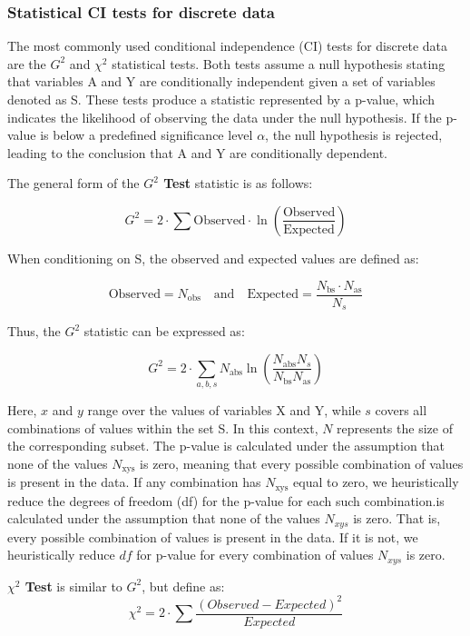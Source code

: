 \documentclass[main.tex]{subfiles}
\begin{document}
\subsubsection*{Statistical CI tests for discrete data}
The most commonly used conditional independence (CI) tests for discrete data are the $ G^2 $ and $ \chi^2 $ statistical tests. Both tests assume a null hypothesis stating that variables A and Y are conditionally independent given a set of variables denoted as S. These tests produce a statistic represented by a p-value, which indicates the likelihood of observing the data under the null hypothesis. If the p-value is below a predefined significance level $ \alpha $, the null hypothesis is rejected, leading to the conclusion that A and Y are conditionally dependent.

The general form of the \textbf{$ G^2 $ Test} statistic is as follows:

\[
G^2 = 2 \cdot \sum \text{Observed} \cdot \ln \left( \frac{\text{Observed}}{\text{Expected}} \right)
\]

When conditioning on S, the observed and expected values are defined as:

\[
\text{Observed} = N_{\text{obs}} \quad \text{and} \quad \text{Expected} = \frac{N_{\text{bs}} \cdot N_{\text{as}}}{N_s}
\]

Thus, the $ G^2 $ statistic can be expressed as:

\[
G^2 = 2 \cdot \sum_{a,b,s} N_{\text{abs}} \ln \left( \frac{N_{\text{abs}} N_s}{N_{\text{bs}} N_{\text{as}}} \right)
\]

Here, $ x $ and $ y $ range over the values of variables X and Y, while $ s $ covers all combinations of values within the set S. In this context, $ N $ represents the size of the corresponding subset. The p-value is calculated under the assumption that none of the values $ N_{\text{xys}} $ is zero, meaning that every possible combination of values is present in the data. If any combination has $ N_{\text{xys}} $ equal to zero, we heuristically reduce the degrees of freedom (df) for the p-value for each such combination.is calculated under the assumption that none of the values $N_{xys}$ is zero. That 
is, every possible combination of values is present in the data. If it is not, we heuristically reduce $df$ for p-value for every combination of values $N_{xys}$ is zero.

\textbf{$ \chi^2 $ Test} is similar to $G^2$, but define as:
\[\chi ^2 = 2 \cdot \sum \frac{(Observed - Expected)^2}{Expected}\]
\end{document}
